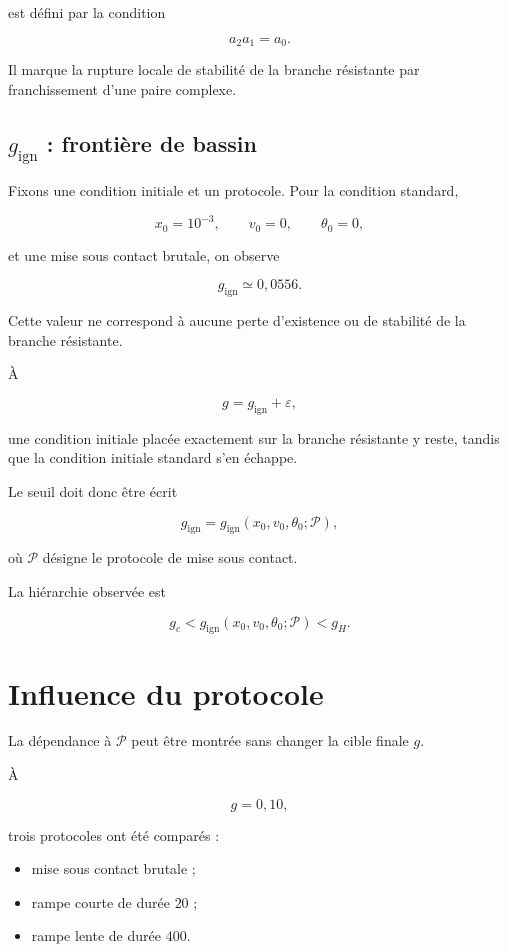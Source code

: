 est défini par la condition

\[
a_2a_1=a_0.
\]

Il marque la rupture locale de stabilité de la branche résistante par franchissement d'une paire complexe.

\subsection{\texorpdfstring{$g_{\mathrm{ign}}$}{gign} : frontière de bassin}

Fixons une condition initiale et un protocole. Pour la condition
standard,

\[
x_0=10^{-3},
\qquad
v_0=0,
\qquad
\theta_0=0,
\]

et une mise sous contact brutale, on observe

\[
\boxed{
g_{\mathrm{ign}}
\simeq
0{,}0556.
}
\]

Cette valeur ne correspond à aucune perte d'existence ou de stabilité
de la branche résistante.

À

\[
g=g_{\mathrm{ign}}+\varepsilon,
\]

une condition initiale placée exactement sur la branche résistante y
reste, tandis que la condition initiale standard s'en échappe.

Le seuil doit donc être écrit

\[
\boxed{
g_{\mathrm{ign}}
=
g_{\mathrm{ign}}
(x_0,v_0,\theta_0;\mathcal P),
}
\]

où \(\mathcal P\) désigne le protocole de mise sous contact.

La hiérarchie observée est

\[
\boxed{
g_c
<
g_{\mathrm{ign}}
(x_0,v_0,\theta_0;\mathcal P)
<
g_H.
}
\]

\section{Influence du protocole}
\label{annexe-resistance-protocole}

La dépendance à \(\mathcal P\) peut être montrée sans changer la cible
finale \(g\).

À

\[
g=0{,}10,
\]

trois protocoles ont été comparés :

\begin{itemize}
\item
  mise sous contact brutale ;
\item
  rampe courte de durée \(20\) ;
\item
  rampe lente de durée \(400\).
\end{itemize}

